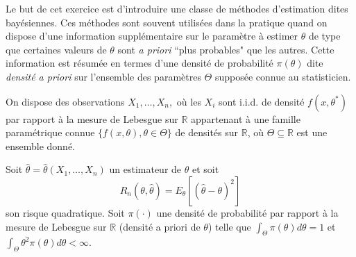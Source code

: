 \documentclass[a4paper,11pt,fleqn]{article}
\newcommand{\R}{\ensuremath{\mathbb{R}}}
\newcommand{\1}{\ensuremath{\mathbbm{1}}}
\begin{document}
Le but de cet exercice est d'introduire une classe de m\'ethodes d'estimation dites bay\'esiennes.
Ces m\'ethodes sont souvent utilis\'ees dans la pratique quand on dispose d'une information suppl\'ementaire
sur le param\`etre \`a estimer $\theta$ de type que certaines valeurs de  $\theta$ sont {\it a priori} ``plus probables"
que les autres. Cette information est r\'esum\'ee en termes d'une densit\'e de probabilit\'e $\pi(\theta)$ dite {\it densit\'e a priori} sur l'ensemble des
param\`etres $\Theta$ suppos\'ee connue au statisticien.


On dispose des observations $X_{1},\ldots,X_{n},$ o\`u les $X_i$ sont i.i.d. de densit\'e $f(x, \theta^*)$ par rapport \`a la mesure de 
Lebesgue sur $\R$ appartenant \`a une famille param\'etrique connue $\{f(x, \theta), \theta\in\Theta\}$ de densit\'es sur $\R$, o\`u $\Theta\subseteq \R$ est une ensemble donn\'e. 

Soit  $\hat\theta = \hat\theta(X_{1},\ldots,X_{n})$ un estimateur de $\theta$ et soit $$R_{n}(\theta,\hat\theta)=E_\theta [(\hat\theta-\theta)^2]$$ son risque quadratique. 
Soit $\pi(\cdot)$ une densit\'e de probabilit\'e par rapport \`a la mesure de 
Lebesgue sur $\R$ (densit\'e a priori de $\theta$) telle que $\int_{\Theta}\pi(\theta)d\theta =1$ et $\int_{\Theta}\theta^2\pi(\theta)d\theta<\infty$.
\end{document}
